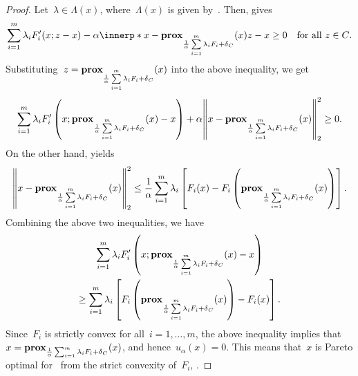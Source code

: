 \documentclass[../../main]{subfiles}
\begin{document}
\begin{proof}
    Let~$\lambda \in \Lambda(x)$, where~$\Lambda(x)$ is given by~.
    Then,  gives
    \begin{equation}
        \sum_{i = 1}^{m} \lambda_i F_i'(x; z - x) - \alpha \innerp*{ x - \prox_{\frac{1}{\alpha} \sum\limits_{i = 1}^{m} \lambda_i F_i + \indicator_C}(x) }{z - x} \ge 0 \forallcondition{z \in C}
    .\end{equation} 
    Substituting~$z = \prox_{\frac{1}{\alpha} \sum\limits_{i = 1}^{m} \lambda_i F_i + \indicator_C}(x)$ into the above inequality, we get
    \begin{equation}
        \sum_{i = 1}^{m} \lambda_i F_i' \left(x; \prox_{\frac{1}{\alpha} \sum\limits_{i = 1}^{m} \lambda_i F_i + \indicator_C}(x) - x \right) + \alpha \norm*{ x - \prox_{\frac{1}{\alpha} \sum\limits_{i = 1}^{m} \lambda_i F_i + \indicator_C}(x) }_2^2 \ge 0
    .\end{equation}
    On the other hand,  yields
    \begin{equation}
        \norm*{x - \prox_{\frac{1}{\alpha} \sum\limits_{i = 1}^{m} \lambda_i F_i + \indicator_C}(x)}_2^2 \le \frac{1}{\alpha} \sum_{i = 1}^{m} \lambda_i \left[ F_i(x) - F_i\left(\prox_{\frac{1}{\alpha} \sum\limits_{i = 1}^{m} \lambda_i F_i + \indicator_C}(x)\right) \right] 
    .\end{equation}
    Combining the above two inequalities, we have
    \begin{multline}
        \sum_{i = 1}^{m} \lambda_i F_i' \left(x; \prox_{\frac{1}{\alpha} \sum\limits_{i = 1}^{m} \lambda_i F_i + \indicator_C}(x) - x \right) \\
        \ge \sum_{i = 1}^{m} \lambda_i \left[ F_i\left(\prox_{\frac{1}{\alpha} \sum\limits_{i = 1}^{m} \lambda_i F_i + \indicator_C}(x)\right) - F_i(x) \right] 
    .\end{multline}
    Since~$F_i$ is strictly convex for all~$i = 1, \dots, m$, the above inequality implies that~$x = \prox_{\frac{1}{\alpha} \sum_{i = 1}^{m} \lambda_i F_i + \indicator_C}(x)$, and hence~$u_\alpha(x) = 0$.
    This means that~$x$ is Pareto optimal for~ from the strict convexity of~$F_i$, .
\end{proof}
\end{document}
